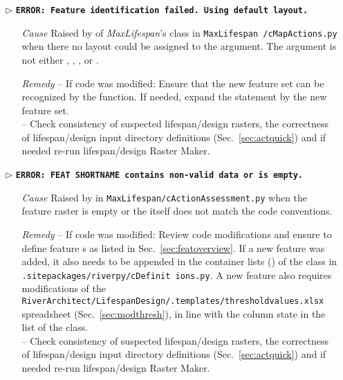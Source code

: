 \begin{itemize}
	\item[$\triangleright$]\textbf{\texttt{ERROR: Feature identification failed. Using default layout.}}
	\begin{itemize}
		\item[\textit{Cause}\hspace{0.27cm}] Raised by  of \textit{MaxLifespan}'s  class in \texttt{MaxLifespan /cMapActions.py} when there no layout could be assigned to the  argument. The  argument is not either , , , or .
		\item[\textit{Remedy}] -- If code was modified: Ensure that the new feature set can be recognized by the  function. If needed, expand the  statement by the new feature set.\\
													 -- Check consistency of suspected lifespan/design rasters, the correctness of lifespan/design input directory definitions (Sec.~\ref{sec:actquick}) and if needed re-run lifespan/design Raster Maker.\\
	\end{itemize}
	
	\item[$\triangleright$]\textbf{\texttt{ERROR: FEAT SHORTNAME contains non-valid data or is empty.}}
	\begin{itemize}
		\item[\textit{Cause}\hspace{0.27cm}] Raised by  in \texttt{MaxLifespan/cActionAssessment.py} when the feature  raster is empty or the  itself does not match the code conventions.
		\item[\textit{Remedy}] -- If code was modified: Review code modifications and ensure to define feature s as listed in Sec.~\ref{sec:featoverview}. If a new feature was added, it also needs to be appended in the container lists () of the  class in \texttt{.site{\myUnderscore}packages/riverpy/cDefinit ions.py}. A new feature also requires modifications of the \texttt{RiverArchitect/LifespanDesign/.templates/threshold{\myUnderscore}values.xlsx} spreadsheet (Sec.~\ref{sec:modthresh}), in line with the column state in the  list of the  class.\\
			 -- Check consistency of suspected lifespan/design rasters, the correctness of lifespan/design input directory definitions (Sec.~\ref{sec:actquick}) and if needed re-run lifespan/design Raster Maker.\\
	\end{itemize}
	

\end{itemize}
